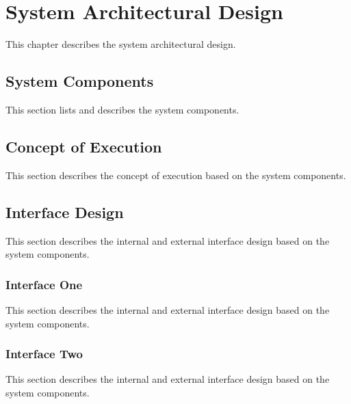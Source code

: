
\chapter{System Architectural Design}
\label{loc:SystemArchitecturalDesign}


This chapter describes the system architectural design.

\section{System Components}
\label{loc:SystemComponents}


This section lists and describes the system components.


\section{Concept of Execution}
\label{loc:ConceptOfEExecution}


This section describes the concept of execution based on the system components.


\section{Interface Design}
\label{loc:InterfaceDesign}


This section describes the internal and external interface design based on the system components.


\subsection{Interface One}
\label{loc:InterfaceOne}
%

This section describes the internal and external interface design based on the system components.

\subsection{Interface Two}
\label{loc:InterfaceTwo}
%

This section describes the internal and external interface design based on the system components.

